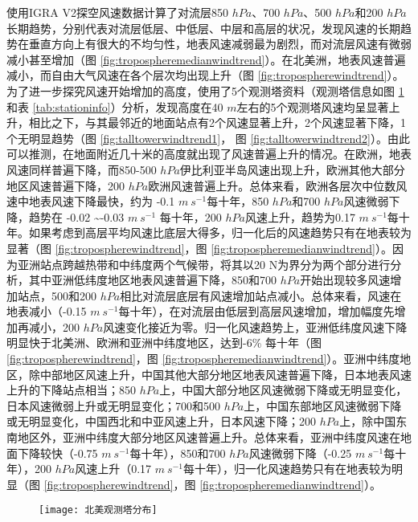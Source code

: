 使用IGRA V2探空风速数据计算了对流层850 $hPa$、700 $hPa$、500 $hPa$和200 $hPa$长期趋势，分别代表对流层低层、中低层、中层和高层的状况，发现风速的长期趋势在垂直方向上有很大的不均匀性，地表风速减弱最为剧烈，而对流层风速有微弱减小甚至增加（图 \ref{fig:tropospheremedianwindtrend}）。在北美洲，地表风速普遍减小，而自由大气风速在各个层次均出现上升（图 \ref{fig:tropospherewindtrend}）。为了进一步探究风速开始增加的高度，使用了5个观测塔资料（观测塔信息如图 \ref{fig:talltower}和表 \ref{tab:stationinfo}）分析，发现高度在40 $m$左右的5个观测塔风速均呈显著上升，相比之下，与其最邻近的地面站点有2个风速显著上升，2个风速显著下降，1个无明显趋势（图 \ref{fig:talltowerwindtrend1}， 图 \ref{fig:talltowerwindtrend2}）。由此可以推测，在地面附近几十米的高度就出现了风速普遍上升的情况。在欧洲，地表风速同样普遍下降，而850-500 $hPa$伊比利亚半岛风速出现上升，欧洲其他大部分地区风速普遍下降，200 $hPa$欧洲风速普遍上升。总体来看，欧洲各层次中位数风速中地表风速下降最快，约为 -0.1 $m ~ s^{-1}$每十年，850 $hPa$和700 $hPa$风速微弱下降，趋势在 -0.02 \textasciitilde -0.03 $m ~ s^{-1}$ 每十年，200 $hPa$风速上升，趋势为0.17 $m ~ s^{-1}$每十年。如果考虑到高层平均风速比底层大得多，归一化后的风速趋势只有在地表较为显著（图 \ref{fig:tropospherewindtrend}，图 \ref{fig:tropospheremedianwindtrend}）。因为亚洲站点跨越热带和中纬度两个气候带，将其以20 N为界分为两个部分进行分析，其中亚洲低纬度地区地表风速普遍下降，850和700 $hPa$开始出现较多风速增加站点，500和200 $hPa$相比对流层底层有风速增加站点减小。总体来看，风速在地表减小（-0.15 $m ~ s^{-1}$每十年），在对流层由低层到高层风速增加，增加幅度先增加再减小，200 $hPa$风速变化接近为零。归一化风速趋势上，亚洲低纬度风速下降明显快于北美洲、欧洲和亚洲中纬度地区，达到-6\% 每十年（图 \ref{fig:tropospherewindtrend}，图 \ref{fig:tropospheremedianwindtrend}）。亚洲中纬度地区，除中部地区风速上升，中国其他大部分地区地表风速普遍下降，日本地表风速上升的下降站点相当；850 $hPa$上，中国大部分地区风速微弱下降或无明显变化，日本风速微弱上升或无明显变化；700和500 $hPa$上，中国东部地区风速微弱下降或无明显变化，中国西北和中亚风速上升，日本风速下降；200 $hPa$上，除中国东南地区外，亚洲中纬度大部分地区风速普遍上升。总体来看，亚洲中纬度风速在地面下降较快（-0.75 $m ~ s^{-1}$每十年），850和700 $hPa$风速微弱下降（-0.25 $m ~ s^{-1}$每十年），200 $hPa$风速上升（0.17 $m ~ s^{-1}$每十年），归一化风速趋势只有在地表较为明显（图 \ref{fig:tropospherewindtrend}，图 \ref{fig:tropospheremedianwindtrend}）。


\begin{figure}[!htbp]
    \centering
    \texttt{[image: 北美观测塔分布]}
    \label{fig:talltower}
\end{figure}

